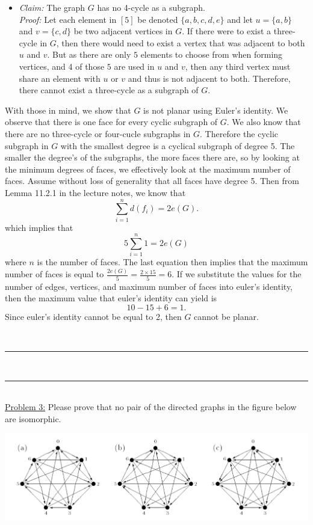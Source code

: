 \documentclass{article}
\newcommand{\problemsep}{\leavevmode\\[0.05in] \rule[\baselineskip/4]{\textwidth}{1pt} \\[0.005in] \rule[\baselineskip]{\textwidth}{1pt}\vspace{-\baselineskip}\leavevmode\\[0.05in]}
\begin{document}
\begin{enumerate}
\begin{itemize}
			\item {\it Claim: } The graph $G$ has no 4-cycle as a subgraph. \\
				{\it Proof: } Let each element in $[5]$ be denoted $\{a, b, c, d, e\}$ and let $u = \{a,b\}$ and $v = \{c, d\}$ be two adjacent vertices in $G$. If there were to exist a three-cycle in $G$, then there would need to exist a vertex that was adjacent to both $u$ and $v$.  But as there are only $5$ elements to choose from when forming vertices, and 4 of those $5$ are used in $u$ and $v$, then any third vertex must share an element with $u$ or $v$ and thus is not adjacent to both.  Therefore, there cannot exist a three-cycle as a subgraph of $G$.

		\end{itemize}
		With those in mind, we show that $G$ is not planar using Euler's identity. We observe that there is one face for every cyclic subgraph of $G$. We also know that there are no three-cycle or four-cucle subgraphs in $G$. Therefore the cyclic subgraph in $G$ with the smallest degree is a cyclical subgraph of degree 5. The smaller the degree's of the subgraphs, the more faces there are, so by looking at the minimum degrees of faces, we effectively look at the maximum number of faces. Assume without loss of generality that all faces have degree 5.  Then from Lemma 11.2.1 in the lecture notes, we know that
		\begin{equation*}
			\sum_{i = 1}^n d(f_i) = 2e(G).
		\end{equation*}
		which implies that
		\begin{equation*}
			5\sum_{i=1}^n 1 = 2e(G)
		\end{equation*}
		where $n$ is the number of faces. The last equation then implies that the maximum number of faces is equal to $\frac{2e(G)}{5} = \frac{2\times 15}{5} = 6$. If we substitute the values for the number of edges, vertices, and maximum number of faces into euler's identity, then the maximum value that euler's identity can yield is 
		\begin{equation*}
			10 - 15 + 6 = 1.
		\end{equation*}
		Since euler's identity cannot be equal to 2, then $G$ cannot be planar.
\end{enumerate}
\problemsep
\noindent\underline{Problem 3:} Please prove that no pair of the directed graphs in the figure below are 
isomorphic.
\begin{center}
    \includegraphics[scale=0.75]{media/reg7Ts.pdf}
\end{center}
\end{document}
